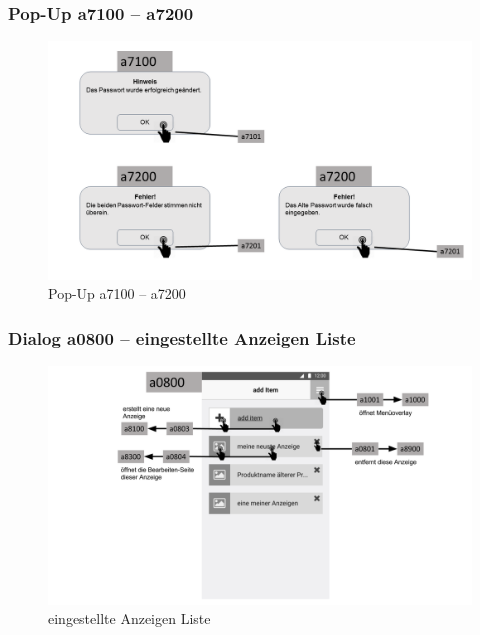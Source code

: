 \documentclass[a4paper,12pt,oneside]{scrartcl}
\begin{document}
\subsubsection{Pop-Up a7100 – a7200}
\begin{figure}[!htbp]
\centering
\noindent\includegraphics[width=\linewidth,height=\textheight,keepaspectratio]{Dialoge/a0700p}
\caption{Pop-Up a7100 – a7200}
\end{figure}
\FloatBarrier

\subsubsection{Dialog a0800 – eingestellte Anzeigen Liste}
\begin{figure}[!htbp]
\centering
\noindent\includegraphics[width=\linewidth,height=\textheight,keepaspectratio]{Dialoge/a0800}
\caption{eingestellte Anzeigen Liste}
\end{figure}
\FloatBarrier
\end{document}
